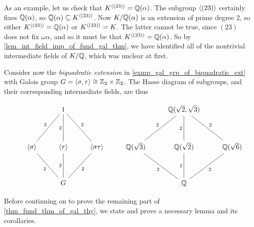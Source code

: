 \begin{example}
    As an example, let us check that $K^{\langle {(23)} \rangle} = \mathbb{{Q}}(\alpha)$. The subgroup $\langle {(23)} \rangle$ certainly fixes $\mathbb{{Q}}(\alpha)$, so $\mathbb{{Q}}(\alpha) \subseteq K^{\langle {(23)} \rangle}$. Now $K/\mathbb{{Q}}(\alpha)$ is an extension of prime degree 2, so either $K^{\langle {(23)} \rangle} = \mathbb{{Q}}(\alpha)$ or $K^{\langle {(23)} \rangle} = K$. The latter cannot be true, since $(23)$ does not fix $\omega \alpha$, and so it must be that $K^{\langle {(23)} \rangle} = \mathbb{{Q}}(\alpha)$. So by \cref{lem_int_field_imp_of_fund_gal_thm}, we have identified all of the nontrivial intermediate fields of $K/\mathbb{{Q}}$, which was unclear at first.
\end{example}

\begin{example}
    Consider now the \emph{biquadratic extension} in \cref{exmp_gal_grp_of_biquadratic_ext} with Galois group $G = \langle {\sigma, \tau} \rangle \cong \mathbb{{Z}}_2 \times \mathbb{{Z}}_2$. The Hasse diagram of subgroups, and their corresponding intermediate fields, are thus
    \begin{figure}[h]
        \[
            \begin{tikzcd}
            	& 1 &&& {\mathbb{Q}(\sqrt{2}, \sqrt{3})} \\
            	\\
            	{\langle \sigma \rangle} & {\langle \tau \rangle} & {\langle \sigma\tau \rangle} & {\mathbb{Q}(\sqrt{3})} & {\mathbb{Q}(\sqrt{2})} & {\mathbb{Q}(\sqrt{6})} \\
            	\\
            	& G &&& {\mathbb{Q}}
            	\arrow["2"', no head, from=1-2, to=3-2]
            	\arrow["2"', no head, from=3-2, to=5-2]
            	\arrow["2"', no head, from=1-2, to=3-1]
            	\arrow["2", no head, from=1-2, to=3-3]
            	\arrow["2"', no head, from=3-1, to=5-2]
            	\arrow["2", no head, from=3-3, to=5-2]
            	\arrow["2"', no head, from=1-5, to=3-4]
            	\arrow["2"', no head, from=1-5, to=3-5]
            	\arrow["2", no head, from=1-5, to=3-6]
            	\arrow["2"', no head, from=3-4, to=5-5]
            	\arrow["2"', no head, from=3-5, to=5-5]
            	\arrow["2", no head, from=3-6, to=5-5]
            \end{tikzcd}
        \]
    \end{figure}
\end{example}

Before continuing on to prove the remaining part of \cref{thm_fund_thm_of_gal_thy}, we state and prove a necessary lemma and its corollaries.

